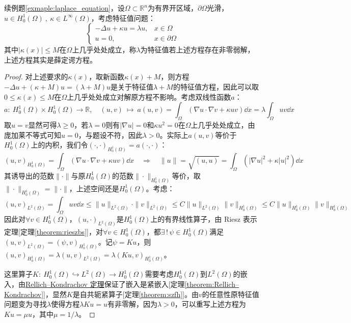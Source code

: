 \begin{example}\label{example:Schrodinger_equation}
续例题\ref{exmaple:laplace_equation}，设$\Omega \subset \mathbb{R}^n$为有界开区域，$\partial\Omega$光滑，$u \in H^1_0(\Omega) \ , \ \kappa \in L^{\infty}(\Omega)$，考虑特征值问题：
\begin{equation}\label{eq:Schrodinger}
\left\{\begin{array}{rl}
-\Delta u+\kappa u = \lambda u, & x \in \Omega \\
u=0, & x \in \partial\Omega
\end{array}\right.
\end{equation}
其中$|\kappa(x)| \leq M$在$\Omega$上几乎处处成立，称$\lambda$为特征值若上述方程存在非零弱解，上述方程其实是薛定谔方程。
\end{example}
\begin{proof}
对上述要求的$\kappa(x)$，取新函数$\kappa(x)+M$，则方程$-\Delta u+(\kappa+M) u = (\lambda+M) u$是关于特征值$\lambda+M$的特征值方程，因此可以取$0 \leq \kappa(x) \leq M$在$\Omega$上几乎处处成立对解原方程不影响。考虑双线性函数$a$：
\[a: \ H^1_0(\Omega) \times H^1_0(\Omega) \to \mathbb{R}, \quad (u,v) \ \mapsto \ a(u,v)=\int_{\Omega}(\nabla u\cdot\nabla v+\kappa uv)\dd{x}=\lambda\int_{\Omega}uv\dd{x}\]
取$u=v$显然可得$\lambda \geq 0$，若$\lambda=0$则有$|\nabla u|=0$和$\kappa u^2=0$在$\Omega$上几乎处处成立，由庞加莱不等式可知$u=0$，与题设不符，因此$\lambda>0$。实际上$a(u,v)$等价于$H_0^1(\Omega)$上的内积，我们令$(\cdot,\cdot)_{H_0^1(\Omega)}=a(\cdot,\cdot)$：
\[(u,v)_{H_0^1(\Omega)}=\int_{\Omega}(\nabla u\cdot\nabla v+\kappa uv)\dd{x} \quad \Rightarrow \quad \|u\|=\sqrt{(u,u)}=\int_{\Omega}(|\nabla u|^2+\kappa |u|^2)\dd{x}\]
其诱导出的范数$\|\cdot\|$与原$H_0^1(\Omega)$的范数$\|\cdot\|_{H_0^1(\Omega)}$等价，取$\|\cdot\|_{H_0^1(\Omega)}=\|\cdot\|$，上述空间还是$H_0^1(\Omega)$。考虑：
\[(u,v)_{L^2(\Omega)}=\int_{\Omega}uv\dd{x}\leq\|u\|_{L^2(\Omega)}\cdot\|v\|_{L^2(\Omega)}\leq C\|u\|_{L^2(\Omega)}\|v\|_{H_0^1(\Omega)}\leq C\|u\|_{H_0^1(\Omega)}\|v\|_{H_0^1(\Omega)}\]
因此对$\forall v \in H_0^1(\Omega)$，$(u,\cdot)_{L^2(\Omega)}$是$H_0^1(\Omega)$上的有界线性算子，由 Riesz 表示定理[定理\ref{theorem:rieszbs}]，对$\forall v \in H_0^1(\Omega)$，都$\exists \, ! \, \psi \in H_0^1(\Omega)$满足$(u,v)_{L^2(\Omega)}=(\psi,v)_{H_0^1(\Omega)}$。记$\psi=Ku$，则$(u,v)_{H_0^1(\Omega)}=\lambda(u,v)_{L^2(\Omega)}=\lambda(Ku,v)_{H_0^1(\Omega)}$。

这里算子$K: \ H_0^1(\Omega) \hookrightarrow L^2(\Omega) \to H_0^1(\Omega)$需要考虑$H_0^1(\Omega)$到$L^2(\Omega)$的嵌入，由\href{https://math.fandom.com/zh/wiki/Rellich-Kondrachov_%E5%AE%9A%E7%90%86}{Rellich–Kondrachov 定理}保证了嵌入是紧嵌入[定理\ref{theorem:Rellich–Kondrachov}]，显然$K$是自共轭紧算子[定理\ref{theorem:szfh}]。由$v$的任意性原特征值问题变为寻找$\lambda$使得方程$\lambda K u=u$有非零解，因为$\lambda>0$，可以重写上述方程为$Ku=\mu u$，其中$\mu=1/\lambda$。


\end{proof}
